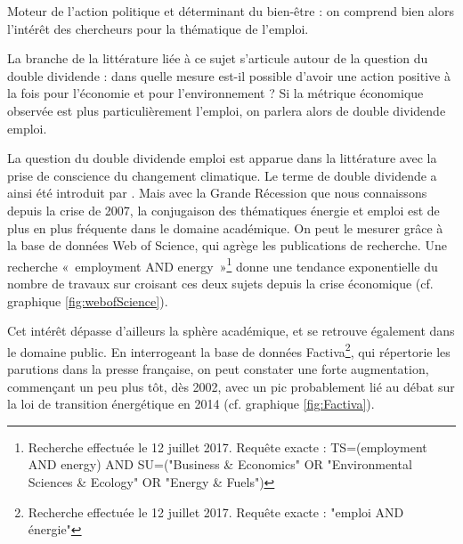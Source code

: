 Moteur de l'action politique et déterminant du bien-être : on comprend bien alors l’intérêt des chercheurs pour la thématique de l'emploi. 

La branche de la littérature liée à ce sujet s'articule autour de la question du double dividende : dans quelle mesure est-il possible d'avoir une action positive à la fois pour l'économie et pour l'environnement ?
Si la métrique économique observée est plus particulièrement l'emploi, on parlera alors de double dividende emploi.

La question du double dividende emploi est apparue dans la littérature avec la prise de conscience du changement climatique. Le terme de double dividende a ainsi été introduit par \citet{Pearce1991}.
Mais avec la Grande Récession que nous connaissons depuis la crise de 2007, la conjugaison des thématiques énergie et emploi est de plus en plus fréquente dans le domaine académique. On peut le mesurer grâce à la base de données Web of Science, qui agrège les publications de recherche. Une recherche «~employment AND energy~»\footnote{Recherche effectuée le 12 juillet 2017. Requête exacte : TS=(employment AND energy) AND SU=("Business \& Economics" OR "Environmental Sciences \& Ecology" OR "Energy \& Fuels")} donne une tendance exponentielle du nombre de travaux sur croisant ces deux sujets depuis la crise économique (cf. graphique \ref{fig:webofScience}).

Cet intérêt dépasse d'ailleurs la sphère académique, et se retrouve également dans le domaine public. En interrogeant la base de données Factiva\footnote{Recherche effectuée le 12 juillet 2017. Requête exacte : "emploi AND énergie"}, qui répertorie les parutions dans la presse française, on peut constater une forte augmentation, commençant un peu plus tôt, dès 2002, avec un pic probablement lié au débat sur la loi de transition énergétique en 2014 (cf. graphique \ref{fig:Factiva}). 


